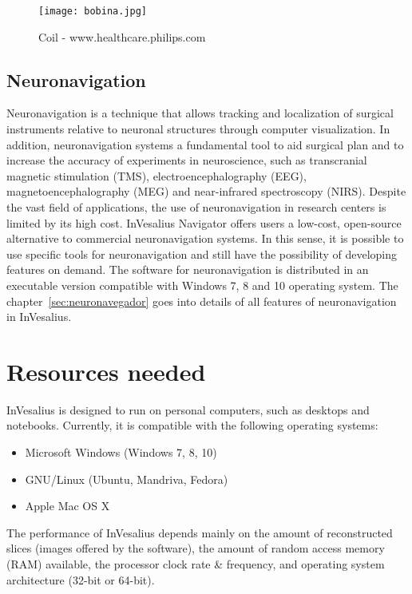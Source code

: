 \begin{figure}[!htb]
\centering
\texttt{[image: bobina.jpg]}
\caption{Coil - www.healthcare.philips.com}
\end{figure}

\subsection{Neuronavigation}
\label{sec:neuronavegador_intro}

Neuronavigation is a technique that allows tracking and localization of surgical instruments relative to neuronal
structures through computer visualization. In addition, neuronavigation systems a fundamental tool to aid surgical plan and to increase the accuracy of experiments in neuroscience, such as transcranial magnetic stimulation (TMS), electroencephalography (EEG), magnetoencephalography (MEG) and near-infrared spectroscopy (NIRS).
Despite the vast field of applications, the use of neuronavigation in research centers is limited by its high cost.
InVesalius Navigator offers users a low-cost, open-source alternative to commercial neuronavigation systems. In this sense, it is possible to use specific tools for
neuronavigation and still have the possibility of developing features on demand. The software for neuronavigation is distributed in an executable version compatible with Windows 7, 8 and 10 operating system. The chapter~\ref{sec:neuronavegador} goes into details of all features of neuronavigation in InVesalius.

\section{Resources needed}

InVesalius is designed to run on personal computers, such as desktops and notebooks. Currently, it is compatible with the following operating systems:

\begin{itemize}
	\item Microsoft Windows (Windows 7, 8, 10)
	\item GNU/Linux (Ubuntu, Mandriva, Fedora) 
	\item Apple Mac OS X
\end{itemize}

The performance of InVesalius depends mainly on the amount of reconstructed slices (images offered by the software), the amount of random access memory (RAM) available, the processor clock rate \& frequency, and operating system architecture (32-bit or 64-bit).

